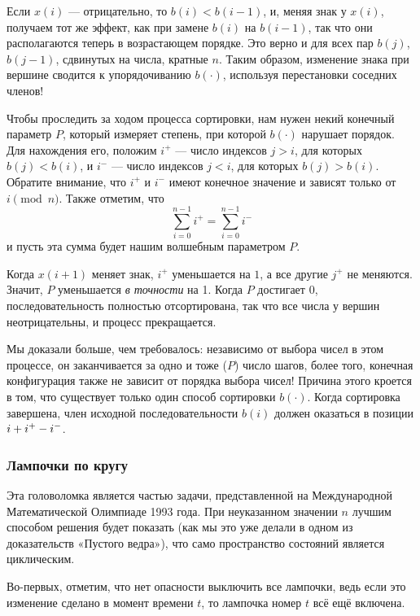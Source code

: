 Если $x(i)$ --- отрицательно, то $b(i) < b(i-1)$, и, меняя знак у $x(i)$, получаем тот же эффект, как при замене $b(i)$ на $b(i - 1)$, так что они располагаются теперь в возрастающем порядке.
Это верно и для всех пар $b(j)$, $b(j - 1)$, сдвинутых на числа, кратные $n$.
Таким образом, изменение знака при вершине сводится к упорядочиванию $b(\cdot)$, используя перестановки соседних членов!

Чтобы проследить за ходом процесса сортировки, нам нужен некий конечный параметр $P$, который измеряет степень, при которой $b(\cdot)$ нарушает порядок. %
Для нахождения его, положим $i^+$ --- число индексов $j > i$, для которых $b(j) < b(i)$, и $i^-$ --- число индексов $j < i$, для которых $b(j) > b(i)$.
Обратите внимание, что $i^+$ и $i^-$ имеют конечное значение и зависят только от $i \pmod n$.
Также отметим, что 
\[\sum_{i=0}^{n-1}i^+=\sum_{i=0}^{n-1}i^-\]
и пусть эта сумма будет нашим волшебным параметром $P$.

Когда $x(i+1)$ меняет знак, $i^+$ уменьшается на $1$, а все другие $j^+$ не меняются.
Значит, $P$ уменьшается \emph{в точности} на 1.
Когда $P$ достигает $0$, последовательность полностью отсортирована, так что все числа у вершин неотрицательны, и процесс прекращается.

Мы доказали больше, чем требовалось:
независимо от выбора чисел в этом процессе, он заканчивается за одно и тоже ($P$) число шагов,
более того, конечная конфигурация также не зависит от порядка выбора чисел!
Причина этого кроется в том, что существует только один способ сортировки $b(\cdot)$.
Когда сортировка завершена, член исходной последовательности $b(i)$ должен оказаться в позиции $i \z+ i^+ - i^-$.
\heart

\subsubsection*{Лампочки по кругу}%

Эта головоломка является частью задачи, представленной на Международной Математической Олимпиаде 1993 года.
При неуказанном значении $n$ лучшим способом решения будет показать (как мы это уже делали в одном из доказательств «Пустого ведра»), что само пространство состояний является циклическим.

\medskip

Во-первых, отметим, что нет опасности выключить все лампочки,
ведь если это изменение сделано в момент времени $t$, то лампочка номер $t$ всё ещё включена.

